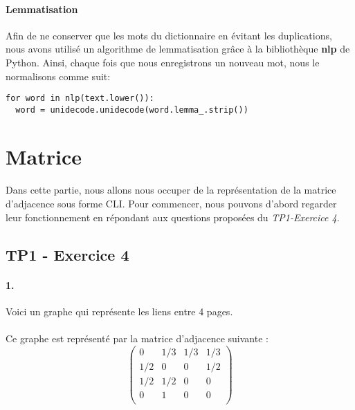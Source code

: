 \documentclass[10pt,a4paper]{article}
\begin{document}
\paragraph{Lemmatisation} Afin de ne conserver que les mots du dictionnaire en évitant les duplications, nous avons utilisé un algorithme de lemmatisation grâce à la bibliothèque \textbf{nlp} de Python. Ainsi, chaque fois que nous enregistrons un nouveau mot, nous le normalisons comme suit:
\begin{verbatim}
for word in nlp(text.lower()):
  word = unidecode.unidecode(word.lemma_.strip())
\end{verbatim}


\section{Matrice}
\paragraph{}Dans cette partie, nous allons nous occuper de la représentation de la matrice d'adjacence sous forme CLI. Pour commencer, nous pouvons d'abord regarder 
leur fonctionnement en répondant aux questions proposées du \textit{TP1-Exercice 4}.

\subsection{TP1 - Exercice 4}
\paragraph{1.} Voici un graphe qui représente les liens entre 4 pages.\\
\begin{center}
\end{center}

\paragraph{}Ce graphe est représenté par la matrice d'adjacence suivante :
$$
\begin{pmatrix}
0 & 1/3 & 1/3 &1/3\\
1/2 & 0 & 0 & 1/2\\
1/2 & 1/2 & 0 & 0\\
0 & 1 & 0 & 0\\
\end{pmatrix}
$$
\end{document}
